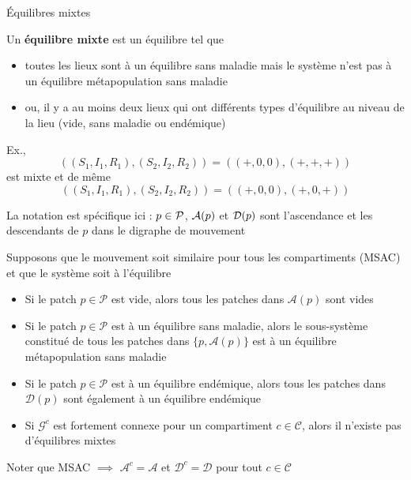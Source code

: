 \documentclass[aspectratio=169]{beamer}\usepackage[]{graphicx}\usepackage[]{xcolor}
\begin{document}
\begin{frame}{Équilibres mixtes}
	\begin{definition}
		Un \textbf{équilibre mixte} est un équilibre tel que
		\begin{itemize}
			\item toutes les lieux sont à un équilibre sans maladie mais le système n'est pas à un équilibre métapopulation sans maladie
			\item ou, il y a au moins deux lieux qui ont différents types d'équilibre au niveau de la lieu (vide, sans maladie ou endémique)
		\end{itemize}
	\end{definition}
	Ex., 
	$$
	((S_1,I_1,R_1),(S_2,I_2,R_2))=((+,0,0),(+,+,+))
	$$
	est mixte et de même
	$$
	((S_1,I_1,R_1),(S_2,I_2,R_2))=((+,0,0),(+,0,+))
	$$
\end{frame}


\begin{frame}
La notation est spécifique ici : $p\in\P$, $\A(p)$ et $\D(p)$ sont l'ascendance et les descendants de $p$ dans le digraphe de mouvement
	\begin{theorem}
		Supposons que le mouvement soit similaire pour tous les compartiments (MSAC) et que le système soit à l'équilibre
		\begin{itemize}
			\item Si le patch $p\in\mathcal{P}$ est vide, alors tous les patches dans $\mathcal{A}(p)$ sont vides 
			\item Si le patch $p\in\mathcal{P}$ est à un équilibre sans maladie, alors le sous-système constitué de tous les patches dans $\{p,\mathcal{A}(p)\}$ est à un équilibre métapopulation sans maladie 
			\item Si le patch $p\in\mathcal{P}$ est à un équilibre endémique, alors tous les patches dans $\mathcal{D}(p)$ sont également à un équilibre endémique
			\item Si $\mathcal{G}^c$ est fortement connexe pour un compartiment $c\in\mathcal{C}$, alors il n'existe pas d'équilibres mixtes
		\end{itemize}
	\end{theorem}
	Noter que MSAC $\implies$ $\mathcal{A}^c=\mathcal{A}$ et $\mathcal{D}^c=\mathcal{D}$ pour tout $c\in\mathcal{C}$
\end{frame}
\end{document}
